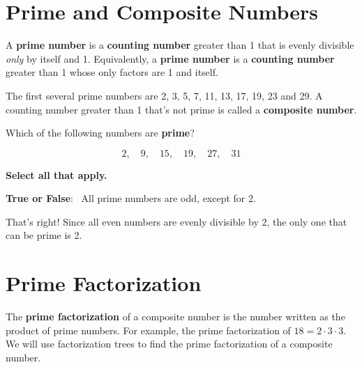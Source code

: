 \documentclass{ximera}[font=12pt]  %
\begin{document}
\section*{Prime and Composite Numbers}

\begin{definition}
A \textbf{prime number} is a \textbf{counting number} greater than 1 that is evenly
divisible \emph{only} by itself and 1.  Equivalently, a \textbf{prime number} is a \textbf{counting number} greater
than 1 whose only factors are 1 and itself.
\end{definition}

The first several prime numbers are 2, 3, 5, 7, 11, 13, 17, 19, 23 and 29.  A counting number greater than 1 that's not prime 
is called a \textbf{composite number}.

\begin{problem}
Which of the following numbers are \textbf{prime}?

  \[ 2, \quad 9, \quad 15, \quad 19, \quad 27, \quad 31 \]

  \textbf{Select all that apply.}
  \begin{selectAll}
  \end{selectAll}

\end{problem}


\begin{problem}  \textcolor{glaucous!55!black}{\textbf{True or False}}: \  All prime numbers are odd, except for 2.

\begin{multipleChoice}
\end{multipleChoice}

\begin{feedback}[correct]
That's right!  Since all even numbers are evenly divisible by 2, the only one that can be prime is 2.
\end{feedback}

\end{problem}

\section*{Prime Factorization}

The \textbf{prime factorization} of a composite number is the number written as the
product of prime numbers.  For example, the prime factorization of $18 =  2 \cdot 3 \cdot 3.$
We will use factorization trees to find the prime factorization of a composite number.
\end{document}
